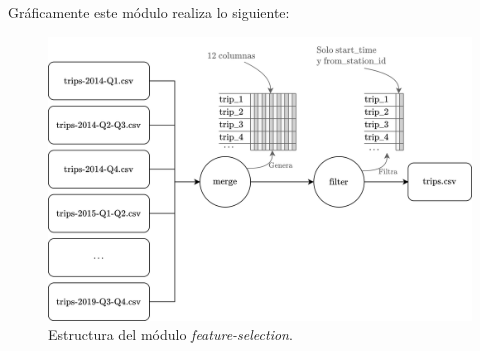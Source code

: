 Gráficamente este módulo realiza lo siguiente:
\begin{figure}[H]
    \centering
    \includegraphics[width=12cm]{images/solution/modules/feature-selection.png}
    \caption{Estructura del módulo \textit{feature-selection}.}
\end{figure}